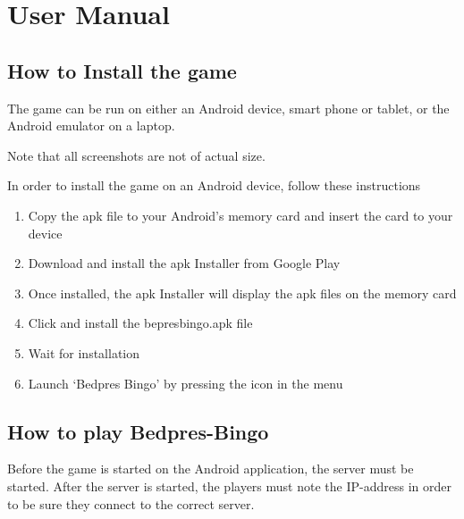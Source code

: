 \section{User Manual}
\label{usermanual}

\subsection{How to Install the game}
The game can be run on either an Android device, smart phone or tablet, or
the Android emulator on a laptop.

Note that all screenshots are not of actual size.

In order to install the game on an Android device, follow these instructions
\begin{enumerate}
\item Copy the apk file to your Android's memory card and insert the card to
your device
\item Download and install the apk Installer from Google Play\cite{website:apk}
\item Once installed, the apk Installer will display the apk files on the
memory card
\item Click and install the bepresbingo.apk file
\item Wait for installation 
\item Launch `Bedpres Bingo' by pressing the icon in the menu
\end{enumerate}

\subsection{How to play Bedpres-Bingo}

Before the game is started on the Android application, the server must be started. After the server is started, the players must note the IP-address in order to be sure they connect to the correct server.

